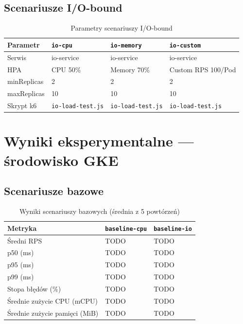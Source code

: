 \subsection{Scenariusze I/O-bound}

\begin{table}[H]
  \centering
  \begin{tabularx}{\textwidth}{|l|X|X|X|}
    \hline
    \textbf{Parametr} & \texttt{io-cpu} & \texttt{io-memory} & \texttt{io-custom} \\
    \hline
    Serwis & io-service & io-service & io-service \\
    HPA & CPU 50\% & Memory 70\% & Custom RPS 100/Pod \\
    minReplicas & 2 & 2 & 2 \\
    maxReplicas & 10 & 10 & 10 \\
    Skrypt k6 & \texttt{io-load-test.js} & \texttt{io-load-test.js} & \texttt{io-load-test.js} \\
    \hline
  \end{tabularx}
  \caption{Parametry scenariuszy I/O-bound}
  \label{tab:io-scenarios}
\end{table}

\section{Wyniki eksperymentalne — środowisko GKE}


\subsection{Scenariusze bazowe}

\begin{table}[H]
  \centering
  \begin{tabularx}{\textwidth}{|l|X|X|}
    \hline
    \textbf{Metryka} & \texttt{baseline-cpu} & \texttt{baseline-io} \\
    \hline
    Średni RPS & TODO & TODO \\
    p50 (ms) & TODO & TODO \\
    p95 (ms) & TODO & TODO \\
    p99 (ms) & TODO & TODO \\
    Stopa błędów (\%) & TODO & TODO \\
    Średnie zużycie CPU (mCPU) & TODO & TODO \\
    Średnie zużycie pamięci (MiB) & TODO & TODO \\
    \hline
  \end{tabularx}
  \caption{Wyniki scenariuszy bazowych (średnia z 5 powtórzeń)}
  \label{tab:baseline-results}
\end{table}

